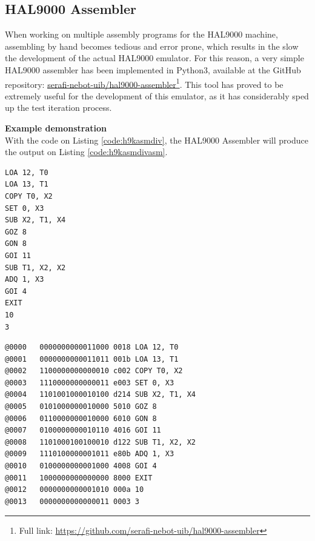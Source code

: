 \documentclass[11pt, a4paper]{article}
\begin{document}
\pagebreak
\appendix
\begin{appendices}
	\section{HAL9000 Assembler}
	\label{appendix:h9kasm}
	When working on multiple assembly programs for the HAL9000 machine, assembling by hand
	becomes tedious and error prone, which results in the slow the development of the actual HAL9000
	emulator. For this reason, a very simple HAL9000 assembler has been implemented in Python3,
	available at the GitHub repository:
	\underline{\href{https://github.com/serafi-nebot-uib/hal9000-assembler}{serafi-nebot-uib/hal9000-assembler}}\footnote{Full
	link:
	\href{https://github.com/serafi-nebot-uib/hal9000-assembler}{https://github.com/serafi-nebot-uib/hal9000-assembler}}.
	This tool has proved to be extremely useful for the development of this emulator, as it has
	considerably sped up the test iteration process.

	\textbf{Example demonstration} \\
	With the code on Listing \ref{code:h9kasmdiv}, the HAL9000 Assembler will produce the output on Listing
	\ref{code:h9kasmdivasm}.

	\noindent
	\begin{minipage}{.40\textwidth}
		\begin{lstlisting}[style=customasm, caption={HAL9000 division implementation}, label={code:h9kasmdiv}]
LOA 12, T0
LOA 13, T1
COPY T0, X2
SET 0, X3
SUB X2, T1, X4
GOZ 8
GON 8
GOI 11
SUB T1, X2, X2
ADQ 1, X3
GOI 4
EXIT
10
3
		\end{lstlisting}
	\end{minipage}
	\hfill
	\begin{minipage}{.55\textwidth}
		\begin{lstlisting}[style=customasm, caption={HAL9000 assmebled division implementation}, label={code:h9kasmdivasm}]
@0000   0000000000011000 0018 LOA 12, T0
@0001   0000000000011011 001b LOA 13, T1
@0002   1100000000000010 c002 COPY T0, X2
@0003   1110000000000011 e003 SET 0, X3
@0004   1101001000010100 d214 SUB X2, T1, X4
@0005   0101000000010000 5010 GOZ 8
@0006   0110000000010000 6010 GON 8
@0007   0100000000010110 4016 GOI 11
@0008   1101000100100010 d122 SUB T1, X2, X2
@0009   1110100000001011 e80b ADQ 1, X3
@0010   0100000000001000 4008 GOI 4
@0011   1000000000000000 8000 EXIT
@0012   0000000000001010 000a 10
@0013   0000000000000011 0003 3
		\end{lstlisting}
	\end{minipage}


\end{appendices}
\end{document}
